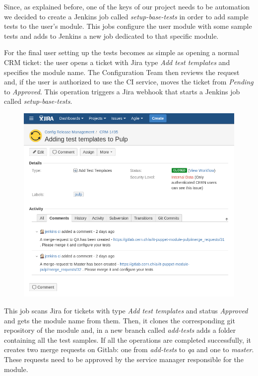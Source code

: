 Since, as explained before, one of the keys of our project needs to be
automation we decided to create a Jenkins job called
\textit{setup-base-tests} in order to add sample tests to the user's
module. This jobs configure the user module with some sample tests and
adds to Jenkins a new job dedicated to that specific module.

For the final user setting up the tests becomes as simple as opening
a normal CRM ticket: the user opens a ticket with Jira type \textit{Add
test templates} and specifies the module name. The Configuration Team then
reviews the request and, if the user is authorized to use the CI service,
moves the ticket from \textit{Pending} to \textit{Approved}. This
operation triggers a Jira webhook that starts a Jenkins job called
\textit{setup-base-tests}.

\begin{figure}[H]
\includegraphics[width=\textwidth,height=\textheight,keepaspectratio]{ContinuousIntegrationWithJenkins/images/add_test_templates.jpg}
\end{figure}

This job scans Jira for tickets with type \textit{Add test templates} and
status \textit{Approved} and gets the module name from them. Then, it
clones the corresponding git repository of the module and, in a new branch
called \textit{add-tests} adds a folder containing all the test samples.
If all the operations are completed successfully, it creates two merge
requests on Gitlab: one from \textit{add-tests} to \textit{qa} and one to
\textit{master}. These requests need to be approved by the service manager
responsible for the module.

